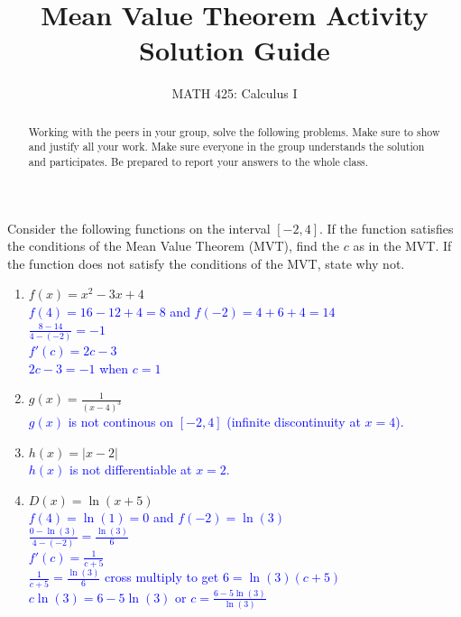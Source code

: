 \documentclass{ximera}
\title{Mean Value Theorem Activity Solution Guide}
\author{MATH 425: Calculus I}
\begin{document}
\begin{abstract}
   Working with the peers in your group, solve the following problems. Make sure to show and justify all your work. Make sure everyone in the group understands the solution and participates. Be prepared to report your answers to the whole class. 
\end{abstract}
\maketitle


\begin{exercise}
   Consider the following functions on the interval $[-2,4]$.  If the function satisfies the conditions of the Mean Value Theorem (MVT), find the $c$ as in the MVT.  If the function does not satisfy the conditions of the MVT, state why not.  
    \begin{enumerate}
       \item $f(x)=x^2-3x+4$\\
        \textcolor{blue}{ $f(4)=16-12+4=8$ and $f(-2)=4+6+4=14$\\
        $\frac{8-14}{4-(-2)}=-1$\\
        $f'(c)=2c-3$\\
        $2c-3=-1$ when $c=1$}
       \item $g(x)=\frac{1}{(x-4)^3}$\\
      \textcolor{blue}{ $g(x)$ is not continous on $[-2,4]$ (infinite discontinuity at $x=4$). }
       \item $h(x)=|x-2|$\\
      \textcolor{blue}{ $h(x)$ is not differentiable at $x=2$.}
       \item $D(x)=\ln(x+5)$\\
        \textcolor{blue}{ $f(4)=\ln(1)=0$ and $f(-2)=\ln(3)$\\
        $\frac{0-\ln(3)}{4-(-2)}=\frac{\ln(3)}{6}$\\
        $f'(c)=\frac{1}{c+5}$\\
        $\frac{1}{c+5}=\frac{\ln(3)}{6}$ cross multiply to get $6=\ln(3)(c+5)$\\
        $c\ln(3)=6-5\ln(3)$ or $c=\frac{6-5\ln(3)}{\ln(3)}$}
    \end{enumerate}

\end{exercise}
\end{document}

